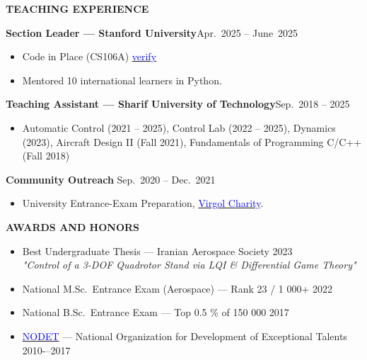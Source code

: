 \documentclass[12pt]{article}
\begin{document}
\begin{center}
	{\noindent \bfseries TEACHING EXPERIENCE}
\end{center}
\vspace{-8pt}
\noindent\textbf{Section Leader — Stanford University}\hfill Apr.\ 2025 -- June\ 2025
\begin{itemize}
  \setlength\itemsep{-2pt}
  \vspace{-5pt}
  \item Code in Place (CS106A) \href{https://digitalcredential.stanford.edu/check/12C01708B752FCC7EF2B1086A984BE4DB81F8FA5052AAF37FD7715630739E31Ad0RoWDlqaUxONEpuYWxHdXRtNkc0dmQrZCtXMjZFVDRoMDRib0hmV2FWaVVXbWV1}{\textcolor{blue}{verify}}
  \item Mentored 10 international learners in Python.
\end{itemize}
\vspace{-5pt}
\noindent\textbf{Teaching Assistant — Sharif University of Technology}\hfill Sep.\ 2018 – 2025
\begin{itemize}
  \setlength\itemsep{-2pt}
  \vspace{-5pt}
  \item Automatic Control (2021 – 2025), Control Lab (2022 – 2025), Dynamics (2023), Aircraft Design II (Fall 2021), Fundamentals of Programming C/C++ (Fall 2018)
\end{itemize}
\vspace{-5pt}
\noindent\textbf{Community Outreach} \hfill Sep.\ 2020 -- Dec.\ 2021
\vspace{-7pt}
\begin{itemize}
  \setlength\itemsep{-2pt}
  \item University Entrance-Exam Preparation, %
  \href{https://www.instagram.com/virgool_charity?igsh=MWxsOGF3cTk1dzY3dw==}{\textcolor{blue}{Virgol Charity}}.%
\end{itemize}


\begin{center}
	{\noindent \bfseries AWARDS AND HONORS}
\end{center}

\begin{itemize}  \itemsep -1pt
  \item Best Undergraduate Thesis — Iranian Aerospace Society \hfill 2023\\
        \textit{"Control of a 3-DOF Quadrotor Stand via LQI \& Differential Game Theory"}
  \item National M.Sc.\ Entrance Exam (Aerospace) — Rank 23 / 1 000+ \hfill 2022
  \item National B.Sc.\ Entrance Exam — Top 0.5 \% of 150 000 \hfill2017
  \item \href{https://en.wikipedia.org/wiki/National_Organization_for_Development_of_Exceptional_Talents}{\textcolor{blue}{NODET}} — National Organization for Development of Exceptional Talents \hfill 2010-–2017
\end{itemize}
\end{document}
